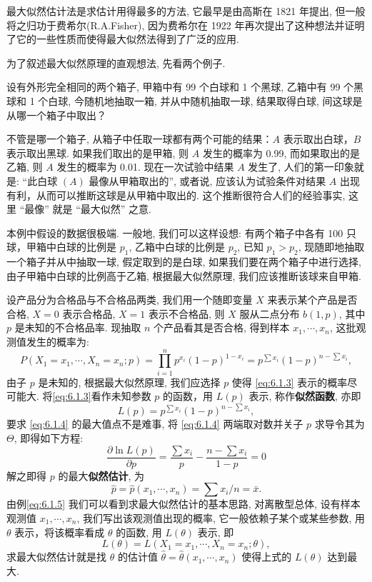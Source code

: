 最大似然估计法是求估计用得最多的方法, 它最早是由高斯在 1821 年提出, 但一般将之归功于费希尔(R.A.Fisher), 因为费希尔在 1922 年再次提出了这种想法并证明了它的一些性质而使得最大似然法得到了广泛的应用.

为了叙述最大似然原理的直观想法, 先看两个例子.

\begin{example}
设有外形完全相同的两个箱子, 甲箱中有 99 个白球和 1 个黑球, 乙箱中有 99 个黑球和 1 个白球, 今随机地抽取一箱, 并从中随机抽取一球, 结果取得白球, 间这球是从哪一个箱子中取出？
\end{example}
\begin{solution}
不管是哪一个箱子, 从箱子中任取一球都有两个可能的结果：$A$ 表示取出白球，$B$ 表示取出黑球. 如果我们取出的是甲箱, 则 $A$ 发生的概率为 0.99, 而如果取出的是乙箱, 则 $A$ 发生的概率为 0.01. 现在一次试验中结果 $A$ 发生了, 人们的第一印象就是: “此白球 $(A)$ 最像从甲箱取出的”, 或者说, 应该认为试验条件对结果 $A$ 出现有利，从而可以推断这球是从甲箱中取出的. 这个推断很符合人们的经验事实, 这里 “最像” 就是 “最大似然” 之意.

本例中假设的数据很极端. 一般地, 我们可以这样设想: 有两个箱子中各有 100 只球，甲箱中白球的比例是 $p_1$, 乙箱中白球的比例是 $p_2$, 已知 $p_1>p_2$, 现随即地抽取一个箱子并从中抽取一球, 假定取到的是白球, 如果我们要在两个箱子中进行选择, 由子甲箱中白球的比例高于乙箱, 根据最大似然原理, 我们应该推断该球来自甲箱.
\end{solution}

\begin{example}\label{exam:6.1.5}
设产品分为合格品与不合格品两类, 我们用一个随即变量 $X$ 来表示某个产品是否合格, $X=0$ 表示合格品, $X=1$ 表示不合格品, 则 $X$ 服从二点分布 $b(1,p)$, 其中 $p$ 是未知的不合格品率. 现抽取 $n$ 个产品看其是否合格, 得到样本 $x_1,\cdots,x_n$, 这批观测值发生的概率为:
\begin{equation}\label{eq:6.1.3}
P(X_1=x_1,\cdots,X_n=x_n;p)=\prod_{i=1}^np^{x_i}(1-p)^{1-x_i}=p^{\sum x_i}(1-p)^{n-\sum x_i}, %
\end{equation}
由子 $p$ 是未知的, 根据最大似然原理, 我们应选择 $p$ 使得 \eqref{eq:6.1.3} 表示的概率尽可能大. 将\eqref{eq:6.1.3}看作未知参数 $p$ 的函数，用 $L(p)$ 表示, 称作\textbf{似然函数}, 亦即
\begin{equation}\label{eq:6.1.4}
L(p)=p^{\sum x_i}(1-p)^{n-\sum x_i},
\end{equation}
要求 \eqref{eq:6.1.4} 的最大值点不是难事, 将 \eqref{eq:6.1.4} 两端取对数并关子 $p$ 求导令其为 $\Theta$, 即得如下方程:
\begin{equation}\label{eq:6.1.5}
\frac{\partial \ln L(p)}{\partial p}=\frac{\sum x_i}{p}-\frac{n-\sum x_i}{1-p}=0
\end{equation}
解之即得 $p$ 的最大\textbf{似然估计}, 为
\[\hat{p}=\hat{p}(x_1,\cdots,x_n)=\sum x_i/n=\bar{x}. \]
由例\ref{eq:6.1.5} 我们可以看到求最大似然估计的基本思路, 对离散型总体, 设有样本观测值 $x_1,\cdots,x_n$, 我们写出该观测值出现的概率, 它一般依赖子某个或某些参数, 用 $\theta$ 表示，将该概率看成 $\theta$ 的函数, 用 $L(\theta)$ 表示, 即
\[L(\theta)=L(X_1=x_1,\cdots,X_n=x_n;\theta), \]
求最大似然估计就是找 $\theta$ 的估计值 $\hat{\theta}=\hat{\theta}(x_1,\cdots,x_n)$ 使得上式的 $L(\theta)$ 达到最大.
\end{example}

